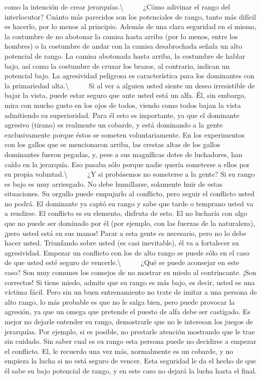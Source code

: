 como la intención de crear jerarquías.\textbackslash{} ~ ~ ~ ¿Cómo
adivinar el rango del interlocutor? Cuánto más parecidos son los
potenciales de rango, tanto más difícil es hacerlo, por lo menos al
principio. Además de una clara seguridad en sí mismo, la costumbre de no
abotonar la camisa hasta arriba (por lo menos, entre los hombres) o la
costumbre de andar con la camisa desabrochada señala un alto potencial
de rango. La camisa abotonada hasta arriba, la costumbre de hablar bajo,
así como la costumbre de cruzar los brazos, al contrario, indican un
potencial bajo. La agresividad peligrosa es característica para los
dominantes con la primariedad alta.\textbackslash{} ~ ~ ~ Si al ver a
alguien usted siente un deseo irresistible de bajar la vista, puede
estar seguro que ante usted está un alfa. Él, sin embargo, mira con
mucho gusto en los ojos de todos, viendo como todos bajan la vista
admitiendo su superioridad. Para él esto es importante, ya que el
dominante agresivo (tirano) es realmente un cobarde, y está dominando a
la gente exclusivamente porque éstos se someten voluntariamente. En los
experimentos con los gallos que se mencionaron arriba, las crestas altas
de los gallos dominantes fueron pegadas, y, pese a sus magníficas dotes
de luchadores, han caído en la jerarquía. Eso pasaba sólo porque nadie
quería someterse a ellos por su propia voluntad.\textbackslash{} ~ ~ ~
¿Y si probásemos no someterse a la gente? Si su rango es bajo es muy
arriesgado. No debe humillarse, solamente huir de estas situaciones. Su
orgullo puede empujarlo al conflicto, pero seguir el conflicto usted no
podrá. El dominante ya captó su rango y sabe que tarde o temprano usted
va a rendirse. El conflicto es su elemento, disfruta de esto. El no
lucharía con algo que no puede ser dominado por él (por ejemplo, con las
fuerzas de la naturaleza), ¡pero usted está en sus manos! Parar a esta
gente es necesario, pero no lo debe hacer usted. Triunfando sobre usted
(es casi inevitable), él va a fortalecer su agresividad. Empezar un
conflicto con los de alto rango se puede sólo en el caso de que usted
esté seguro de vencerle.\textbackslash{} ~ ~ ~ ¿Qué se puede aconsejar
en este caso? Son muy comunes los consejos de no mostrar su miedo al
contrincante. ¡Son correctos! Si tiene miedo, admite que su rango es más
bajo, es decir, usted es una víctima fácil. Pero sin un buen
entrenamiento no trate de imitar a una persona de alto rango, lo más
probable es que no le salga bien, pero puede provocar la agresión, ya
que un omega que pretende el puesto de alfa debe ser castigado. Es mejor
no dejarle entender su rango, demostrarle que no le interesan los juegos
de jerarquías. Por ejemplo, si es posible, no prestarle atención
mostrando que le trae sin cuidado. Sin saber cual es su rango esta
persona puede no decidirse a empezar el conflicto. El, le recuerdo una
vez más, normalmente es un cobarde, y no empieza la lucha si no está
seguro de vencer. Esta seguridad le da el hecho de que él sabe su bajo
potencial de rango, y en este caso no dejará la lucha hasta el final.

